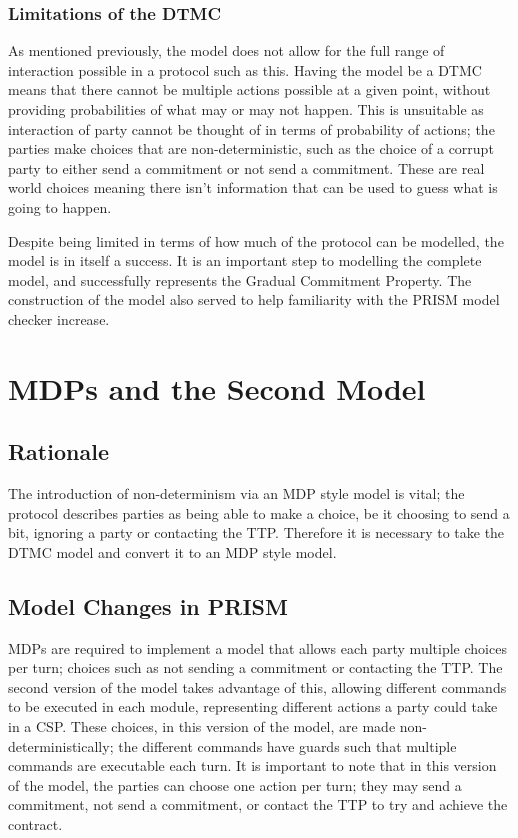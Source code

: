 \documentclass{l4proj}
\begin{document}
\subsection{Limitations of the DTMC}

As mentioned previously, the model does not allow for the full range of interaction possible in a protocol such as this. Having the model be a DTMC means that there cannot be multiple actions possible at a given point, without providing probabilities of what may or may not happen. This is unsuitable as interaction of party cannot be thought of in terms of probability of actions; the parties make choices that are non-deterministic, such as the choice of a corrupt party to either send a commitment or not send a commitment. These are real world choices meaning there isn't information that can be used to guess what is going to happen. 

Despite being limited in terms of how much of the protocol can be modelled, the model is in itself a success. It is an important step to modelling the complete model, and successfully represents the Gradual Commitment Property. The construction of the model also served to help familiarity with the PRISM model checker increase.

\chapter{MDPs and the Second Model}

\section{Rationale}
The introduction of non-determinism via an MDP style model is vital; the protocol describes parties as being able to make a choice, be it choosing to send a bit, ignoring a party or contacting the TTP. Therefore it is necessary to take the DTMC model and convert it to an MDP style model. 


\section{Model Changes in PRISM}

MDPs are required to implement a model that allows each party multiple choices per turn; choices such as not sending a commitment or contacting the TTP. The second version of the model takes advantage of this, allowing different commands to be executed in each module, representing different actions a party could take in a CSP. These choices, in this version of the model, are made non-deterministically; the different commands have guards such that multiple commands are executable each turn. It is important to note that in this version of the model, the parties can choose one action per turn; they may send a commitment, not send a commitment, or contact the TTP to try and achieve the contract.
\end{document}
